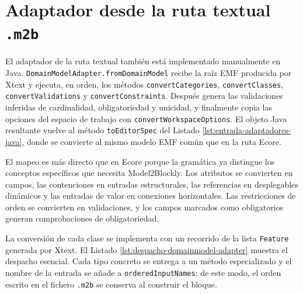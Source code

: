 \section{Adaptador desde la ruta textual \texttt{.m2b}}
\label{sec:implementacion-domainmodel-adapter}

El adaptador de la ruta textual también está implementado manualmente en Java.
\texttt{DomainModelAdapter.fromDomainModel} recibe la raíz EMF producida por
Xtext y ejecuta, en orden, los métodos \texttt{convertCategories},
\texttt{convertClasses}, \texttt{convertValidations} y
\texttt{convertConstraints}. Después genera las validaciones inferidas de
cardinalidad, obligatoriedad y unicidad, y finalmente copia las opciones del
espacio de trabajo con \texttt{convertWorkspace}\allowbreak\texttt{Options}. El objeto Java resultante vuelve
al método \texttt{toEditorSpec} del Listado
\ref{lst:entrada-adaptadores-java}, donde se convierte al mismo modelo EMF común
que en la ruta Ecore.

El mapeo es más directo que en Ecore porque la gramática ya distingue los
conceptos específicos que necesita Model2Blockly. Los atributos se convierten en
campos, las contenciones en entradas estructurales, las referencias en
desplegables dinámicos y las entradas de valor en conexiones horizontales. Las
restricciones de orden se convierten en validaciones, y los campos marcados como
obligatorios generan comprobaciones de obligatoriedad.

La conversión de cada clase se implementa con un recorrido de la lista
\texttt{Feature} generada por Xtext. El Listado
\ref{lst:despacho-domainmodel-adapter} muestra el despacho esencial. Cada tipo
concreto se entrega a un método especializado y el nombre de la entrada se añade
a \texttt{orderedInputNames}; de este modo, el orden escrito en el fichero
\texttt{.m2b} se conserva al construir el bloque.

